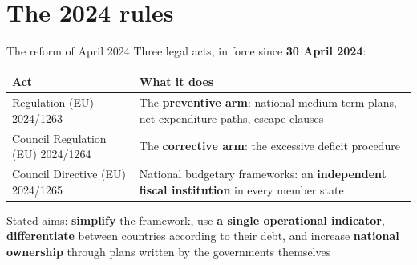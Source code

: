 \documentclass[aspectratio=169,xcolor=table]{beamer}
\begin{document}
\section{The 2024 rules}

\begin{frame}{The reform of April 2024}
\small
Three legal acts, in force since \textbf{30 April 2024}:
\vspace{0.1cm}

\centering\footnotesize
\begin{tabular}{L{4.2cm}L{8.6cm}}
\toprule
\textbf{Act} & \textbf{What it does}\\
\midrule
Regulation (EU) 2024/1263 & The \textbf{preventive arm}: national medium-term plans, net expenditure paths, escape clauses \\
Council Regulation (EU) 2024/1264 & The \textbf{corrective arm}: the excessive deficit procedure \\
Council Directive (EU) 2024/1265 & National budgetary frameworks: an \textbf{independent fiscal institution} in every member state \\
\bottomrule
\end{tabular}
\vspace{0.15cm}

\raggedright\small
Stated aims: \textbf{simplify} the framework, use \textbf{a single operational indicator}, \textbf{differentiate} between countries according to their debt, and increase \textbf{national ownership} through plans written by the governments themselves
\end{frame}
\end{document}
